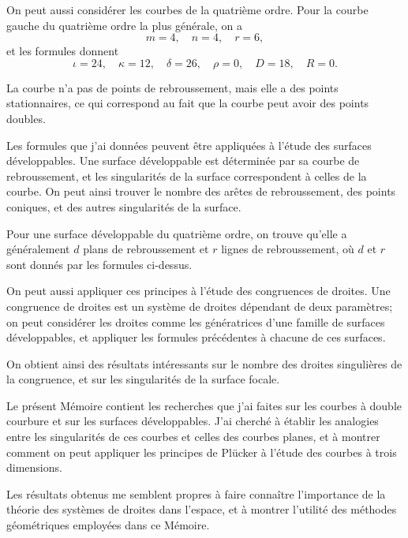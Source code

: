\documentclass[11pt,a4paper]{book}
\begin{document}
\newpage
\setcounter{page}{213}

On peut aussi consid\'{e}rer les courbes de la quatri\`{e}me ordre. Pour la courbe gauche
du quatri\`{e}me ordre la plus g\'{e}n\'{e}rale, on a
\[
m = 4, \quad n = 4, \quad r = 6,
\]
et les formules donnent
\[
\iota = 24, \quad \kappa = 12, \quad \delta = 26, \quad \rho = 0, \quad D = 18, \quad R = 0.
\]

La courbe n'a pas de points de rebroussement, mais elle a des points stationnaires,
ce qui correspond au fait que la courbe peut avoir des points doubles.

\newpage
\setcounter{page}{214}

Les formules que j'ai donn\'{e}es peuvent \^{e}tre appliqu\'{e}es \`{a} l'\'{e}tude des surfaces d\'{e}veloppables.
Une surface d\'{e}veloppable est d\'{e}termin\'{e}e par sa courbe de rebroussement, et les singularit\'{e}s
de la surface correspondent \`{a} celles de la courbe. On peut ainsi trouver le nombre des
ar\^{e}tes de rebroussement, des points coniques, et des autres singularit\'{e}s de la surface.

Pour une surface d\'{e}veloppable du quatri\`{e}me ordre, on trouve qu'elle a g\'{e}n\'{e}ralement
$d$ plans de rebroussement et $r$ lignes de rebroussement, o\`{u} $d$ et $r$ sont donn\'{e}s par les
formules ci-dessus.

\newpage
\setcounter{page}{215}

On peut aussi appliquer ces principes \`{a} l'\'{e}tude des congruences de droites. Une
congruence de droites est un syst\`{e}me de droites d\'{e}pendant de deux param\`{e}tres; on peut
consid\'{e}rer les droites comme les g\'{e}n\'{e}ratrices d'une famille de surfaces d\'{e}veloppables, et
appliquer les formules pr\'{e}c\'{e}dentes \`{a} chacune de ces surfaces.

On obtient ainsi des r\'{e}sultats int\'{e}ressants sur le nombre des droites singuli\`{e}res de la
congruence, et sur les singularit\'{e}s de la surface focale.

\newpage
\setcounter{page}{216}

Le pr\'{e}sent M\'{e}moire contient les recherches que j'ai faites sur les courbes \`{a} double
courbure et sur les surfaces d\'{e}veloppables. J'ai cherch\'{e} \`{a} \'{e}tablir les analogies entre les
singularit\'{e}s de ces courbes et celles des courbes planes, et \`{a} montrer comment on peut
appliquer les principes de Pl\"{u}cker \`{a} l'\'{e}tude des courbes \`{a} trois dimensions.

Les r\'{e}sultats obtenus me semblent propres \`{a} faire conna\^{i}tre l'importance de la th\'{e}orie
des syst\`{e}mes de droites dans l'espace, et \`{a} montrer l'utilit\'{e} des m\'{e}thodes g\'{e}om\'{e}triques
employ\'{e}es dans ce M\'{e}moire.
\end{document}
